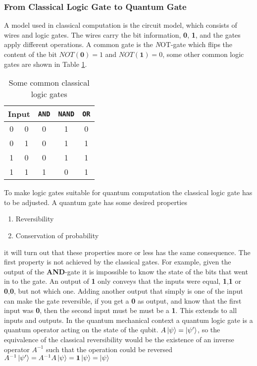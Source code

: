 \subsubsection{From Classical Logic Gate to Quantum Gate}
A model used in classical computation is the circuit model, which consists of wires and logic gates. The wires carry the bit information, \textbf{0}, \textbf{1}, and the gates apply different operations. A common gate is the {\textit NOT}-gate which flips the content of the bit $NOT(\textbf{0}) = 1$ and $NOT(\textbf{1}) = 0$, some other common logic gates are shown in Table \ref{tab:gates}. 

\begin{table}
    \centering
    \begin{tabular}{|c|c|c|c|c|}
    \hline
    \multicolumn{2}{|c|}{Input} & {\tt AND} & {\tt NAND} & {\tt OR}\\
    \hline
    0 & 0 & 0& 1& 0\\
    0 & 1 & 0& 1& 1\\
    1 & 0 & 0& 1& 1\\
    1 & 1 & 1& 0& 1\\
    \hline
    \end{tabular}
    \caption{Some common classical logic gates}
    \label{tab:gates}
\end{table}


To make logic gates suitable for quantum computation the classical logic gate has to be adjusted. A quantum gate has some desired properties
\begin{enumerate}
\item Reversibility 
\item Conservation of probability
\end{enumerate}
it will turn out that these properties more or less has the same consequence. The first property is not achieved by the classical gates. For example, given the output of the \textbf{AND}-gate it is impossible to know the state of the bits that went in to the gate. An output of \textbf{1} only conveys that the inputs were equal, \textbf{1},\textbf{1} or \textbf{0},\textbf{0}, but not which one. Adding another output that simply is one of the input can make the gate reversible, if you get a \textbf{0} as output, and know that the first input was \textbf{0}, then the second input must be must be a \textbf{1}. This extends to all inputs and outputs. In the quantum mechanical context a quantum logic gate is a quantum operator acting on the state of the qubit. $A\ket{\psi} = \ket{\psi'}$, so the equivalence of the classical reversibility would be the existence of an inverse operator $A^{-1}$ such that the operation could be reversed $A^{-1}\ket{\psi'} = A^{-1}A\ket{\psi} = \mathbf{1}\ket{\psi} = \ket{\psi}$

